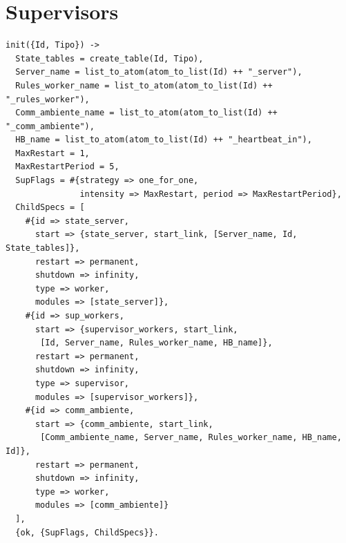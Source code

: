 \documentclass[italian]{memoir}
\begin{document}
\chapter{Supervisors}\label{code:supervisor}
\begin{verbatim}
init({Id, Tipo}) ->
  State_tables = create_table(Id, Tipo),
  Server_name = list_to_atom(atom_to_list(Id) ++ "_server"),
  Rules_worker_name = list_to_atom(atom_to_list(Id) ++ "_rules_worker"),
  Comm_ambiente_name = list_to_atom(atom_to_list(Id) ++ "_comm_ambiente"),
  HB_name = list_to_atom(atom_to_list(Id) ++ "_heartbeat_in"),
  MaxRestart = 1,
  MaxRestartPeriod = 5,
  SupFlags = #{strategy => one_for_one, 
               intensity => MaxRestart, period => MaxRestartPeriod},
  ChildSpecs = [
    #{id => state_server,
      start => {state_server, start_link, [Server_name, Id, State_tables]},
      restart => permanent,
      shutdown => infinity,
      type => worker,
      modules => [state_server]},
    #{id => sup_workers,
      start => {supervisor_workers, start_link,
       [Id, Server_name, Rules_worker_name, HB_name]},
      restart => permanent,
      shutdown => infinity,
      type => supervisor,
      modules => [supervisor_workers]},
    #{id => comm_ambiente,
      start => {comm_ambiente, start_link, 
       [Comm_ambiente_name, Server_name, Rules_worker_name, HB_name, Id]},
      restart => permanent,
      shutdown => infinity,
      type => worker,
      modules => [comm_ambiente]}
  ],
  {ok, {SupFlags, ChildSpecs}}.
\end{verbatim}
\end{document}
